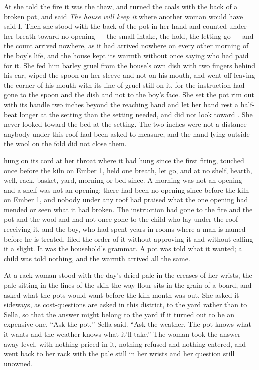 At  she told the fire it was the thaw, and turned the coals with the back of a broken pot, and said \emph{The house will keep it} where another woman would have said I. Then she stood with the back of the pot in her hand and counted under her breath toward no opening --- the small intake, the hold, the letting go --- and the count arrived nowhere, as it had arrived nowhere on every other morning of the boy's life, and the house kept its warmth without once saying who had paid for it. She fed him barley gruel from the house's own dish with two fingers behind his ear, wiped the spoon on her sleeve and not on his mouth, and went off leaving the corner of his mouth with its line of gruel still on it, for the instruction had gone to the spoon and the dish and not to the boy's face. She set the pot rim out with its handle two inches beyond the reaching hand and let her hand rest a half-beat longer at the setting than the setting needed, and did not look toward . She never looked toward the bed at the setting. The two inches were not a distance anybody under this roof had been asked to measure, and the hand lying outside the wool on the fold did not close them.

 hung on its cord at her throat where it had hung since the first firing, touched once before the kiln on Ember 1, held one breath, let go, and at no shelf, hearth, well, rack, basket, yard, morning or bed since. A morning was not an opening and a shelf was not an opening; there had been no opening since before the kiln on Ember 1, and nobody under any roof had praised what the one opening had mended or seen what it had broken. The instruction had gone to the fire and the pot and the wool and had not once gone to the child who lay under the roof receiving it, and the boy, who had spent years in rooms where a man is named before he is treated, filed the order of it without approving it and without calling it a slight. It was the household's grammar. A pot was told what it wanted; a child was told nothing, and the warmth arrived all the same.

\scenebreak

At  a rack woman stood with the day's  dried pale in the creases of her wrists, the pale sitting in the lines of the skin the way flour sits in the grain of a board, and asked what the pots would want before the kiln month was out. She asked it sideways, as cost-questions are asked in this district, to the yard rather than to Sella, so that the answer might belong to the yard if it turned out to be an expensive one. “Ask the pot,” Sella said. “Ask the weather. The pot knows what it wants and the weather knows what it'll take.” The woman took the answer away level, with nothing priced in it, nothing refused and nothing entered, and went back to her rack with the pale still in her wrists and her question still unowned.

